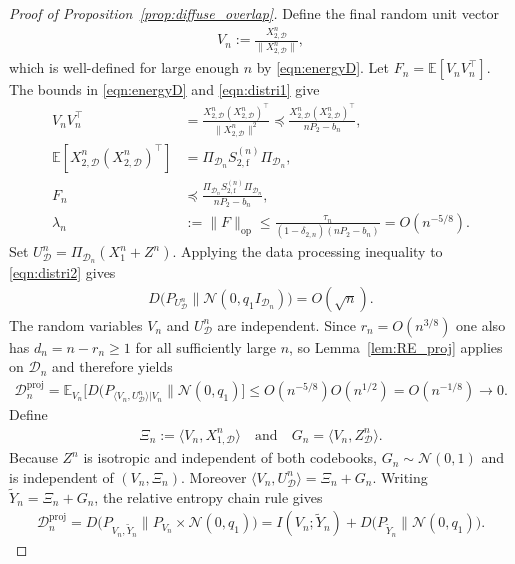 \documentclass[11pt,onecolumn]{IEEEtran}
\newcommand{\calD}{\mathcal{D}}
\newcommand{\calN}{\mathcal{N}}
\newcommand{\rmf}{\mathrm{f}}
\newcommand{\bbE}{\mathbb{E}}
\newcommand{\tilY}{\tilde{Y}}
\begin{document}
\begin{proof}[Proof of Proposition~\ref{prop:diffuse_overlap}]
    Define the final random unit vector
    \begin{align}
        V_n := \frac{X_{2,\calD}^n}{\|X_{2,\calD}^n\|},
    \end{align}
    which is well-defined for large enough $n$ by \eqref{eqn:energyD}. Let $F_n = \bbE [ V_n V_n^\top]$. The bounds in \eqref{eqn:energyD} and  \eqref{eqn:distri1} give
    \begin{align}
        V_n V_n^\top &= \frac{X_{2,\calD}^n(X_{2,\calD}^n)^\top}{\|X_{2,\calD}^n\|^2}\preceq \frac{X_{2,\calD}^n(X_{2,\calD}^n)^\top}{nP_2-b_n} ,\\
        \bbE[ X_{2,\calD}^n(X_{2,\calD}^n)^\top]  &= \Pi_{\calD_n} S_{2,\rmf}^{(n)}\Pi_{\calD_n},\\
        F_n& \preceq\frac{ \Pi_{\calD_n} S_{2,\rmf}^{(n)}\Pi_{\calD_n}}{nP_2-b_n},\\
        \lambda_n &:=\|F\|_{\mathrm{op}}\le\frac{\tau_n}{(1-\delta_{2,n})(nP_2-b_n)}= O(n^{-5/8}).
    \end{align}
    Set $U_\calD^n=\Pi_{\calD_n}(X_1^n+Z^n)$.  Applying the data processing inequality to \eqref{eqn:distri2} gives 
    \begin{align}
        D \big(P_{U_\calD^n}\|\calN(0,q_1 I_{\calD_n})\big)=O(\sqrt{n}).
    \end{align}
    The random variables $V_n$ and $U_\calD^n$ are independent. Since $r_n=O(n^{3/8})$ one also has $d_n=n-r_n\ge 1$ for all sufficiently large $n$, so Lemma~\ref{lem:RE_proj} applies on $\calD_n$ and therefore yields
    \begin{align}
        \calD_n^{\mathrm{proj}}=\bbE_{V_n}\big[ D(P_{\langle V_n ,U_\calD^n\rangle  |V_n} \| \calN(0,q_1) \big]\le O(n^{-5/8}) O(n^{1/2})=O(n^{-1/8})\to0.
    \end{align}
    Define 
    \begin{align}
        \Xi_n:=\langle V_n, X_{1,\calD}^n \rangle \quad\mbox{and}\quad G_n=\langle V_n, Z_\calD^n \rangle.
    \end{align}
Because $Z^n$ is isotropic and independent of both codebooks, $G_n \sim \calN(0,1)$ and is independent of $(V_n, \Xi_n)$. Moreover $\langle V_n ,U_\calD^n\rangle=\Xi_n+G_n$. Writing $\tilY_n=\Xi_n+G_n$, the relative entropy chain rule gives
\begin{align}
    \calD_n^{\mathrm{proj}}=D\big( P_{V_n,\tilY_n}\|P_{V_n}\times \calN(0,q_1) \big)=I(V_n;\tilY_n)+D\big(P_{\tilY_n}\|\calN(0,q_1) \big).

\end{align}
\end{proof}
\end{document}

